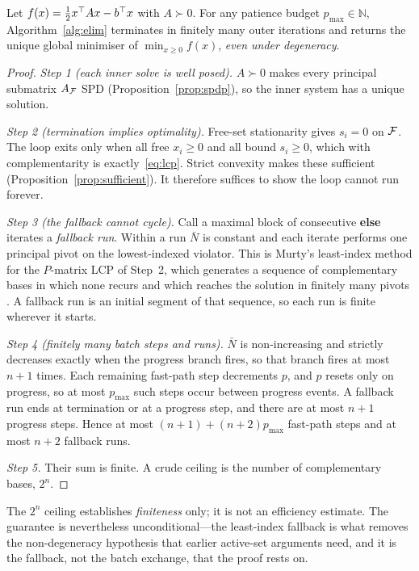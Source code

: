 \begin{theorem}
\label{thm:termination}
Let $f(x) = \tfrac12 x^{\top} A x - b^{\top} x$ with $A \succ 0$. For any patience budget
$p_{\max} \in \mathbb{N}$, Algorithm~\ref{alg:elim} terminates in finitely many outer
iterations and returns the unique global minimiser of $\min_{x\ge0} f(x)$,
\emph{even under degeneracy}.
\end{theorem}

\begin{proof}
\emph{Step 1 (each inner solve is well posed).} $A \succ 0$ makes every principal
submatrix $A_{\mathcal{F}}$ SPD (Proposition~\ref{prop:spdp}), so the inner system has a
unique solution.

\emph{Step 2 (termination implies optimality).} Free-set stationarity gives
$s_i = 0$ on $\mathcal{F}$. The loop exits only when all free $x_i \ge 0$ and all bound
$s_i \ge 0$, which with complementarity is exactly~\eqref{eq:lcp}. Strict convexity
makes these sufficient (Proposition~\ref{prop:sufficient}). It therefore suffices to
show the loop cannot run forever.

\emph{Step 3 (the fallback cannot cycle).} Call a maximal block of consecutive
\textbf{else} iterates a \emph{fallback run}. Within a run $\bar N$ is constant and
each iterate performs one principal pivot on the lowest-indexed violator. This is
Murty's least-index method for the $P$-matrix LCP of Step~2, which generates a
sequence of complementary bases in which none recurs and which reaches the solution
in finitely many pivots \cite{murty1988}. A fallback run is an initial segment of
that sequence, so each run is finite wherever it starts.

\emph{Step 4 (finitely many batch steps and runs).} $\bar N$ is non-increasing and
strictly decreases exactly when the progress branch fires, so that branch fires at
most $n+1$ times. Each remaining fast-path step decrements $p$, and $p$ resets only
on progress, so at most $p_{\max}$ such steps occur between progress events.
A fallback run ends at termination or at a progress step, and there are at most
$n+1$ progress steps. Hence at most $(n+1) + (n+2)p_{\max}$ fast-path steps and at
most $n+2$ fallback runs.

\emph{Step 5.} Their sum is finite. A crude ceiling is the number of complementary
bases, $2^n$.
\end{proof}

The $2^n$ ceiling establishes \emph{finiteness} only; it is not an efficiency
estimate. The guarantee is nevertheless unconditional---the least-index fallback is
what removes the non-degeneracy hypothesis that earlier active-set arguments need,
and it is the fallback, not the batch exchange, that the proof rests on.

